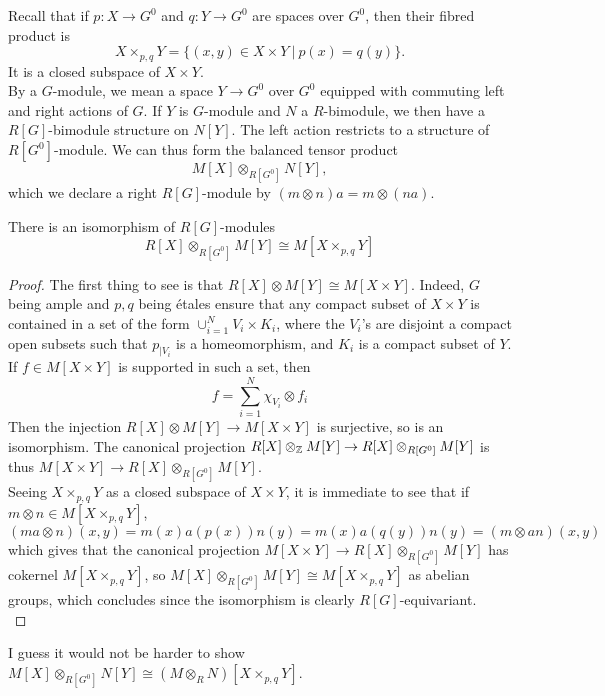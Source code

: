 Recall that if $p: X\rightarrow G^0$ and $q: Y\rightarrow G^0$ are spaces over $G^0$, then their fibred product is 
\[X\times_{p,q}Y = \{(x,y)\in X\times Y \ | \ p(x)= q(y)\}.\]
It is a closed subspace of $X\times Y$.\\

By a $G$-module, we mean a space $Y\rightarrow G^0$ over $G^0$ equipped with commuting left and right actions of $G$. If $Y$ is $G$-module and $N$ a $R$-bimodule, we then have a $R[G]$-bimodule structure on $N[Y]$. The left action restricts to a structure of $R[G^0]$-module. We can thus form the balanced tensor product
\[M[X]\otimes_{R[G^0]} N[Y],\]
which we declare a right $R[G]$-module by $(m\otimes n)a = m\otimes (na)$.

\begin{prop}
There is an isomorphism of $R[G]$-modules
\[R[X]\otimes_{R[G^0]} M[Y] \cong M[X\times_{p,q}Y] \]
\end{prop}

\begin{proof}
The first thing to see is that $R[X]\otimes M[Y] \cong M[X\times Y]$. Indeed, $G$ being ample and $p,q$ being \'etales ensure that any compact subset of $X\times Y$ is contained in a set of the form $\cup_{i=1}^N V_i \times K_i$, where the $V_i $'s are disjoint a compact open subsets such that $p_{|V_i}$ is a homeomorphism, and $K_i$ is a compact subset of $Y$. If $f\in M[X\times Y]$ is supported in such a set, then 
\[f = \sum_{i=1}^N \chi_{V_i} \otimes f_i\]
Then the injection $R[X]\otimes M[Y] \rightarrow M[X\times Y]$ is surjective, so is an isomorphism. The canonical projection $R[X]\otimes_\mathbb Z M[Y] \rightarrow R[X]\otimes_{R[G^0]} M[Y] $ is thus $M[X\times Y] \rightarrow R[X]\otimes_{R[G^0]} M[Y] $.\\
 
Seeing $X\times_{p,q} Y$ as a closed subspace of $X\times Y$, it is immediate to see that if $m\otimes n \in M[X\times_{p,q} Y]$,
\[(ma \otimes n)(x,y) = m(x)a(p(x))n(y) = m(x)a(q(y))n(y) = (m\otimes an)(x,y)\]
which gives that the canonical projection $M[X\times Y]\rightarrow R[X]\otimes_{R[G^0]} M[Y]$ has cokernel $M[X\times_{p,q} Y]$, so $M[X]\otimes_{R[G^0]} M[Y] \cong M[X\times_{p,q}Y] $ as abelian groups, which concludes since the isomorphism is clearly $R[G]$-equivariant.  \\
\end{proof}
I guess it would not be harder to show $M[X]\otimes_{R[G^0]} N[Y] \cong (M\otimes_R N)[X\times_{p,q}Y] $. \\

